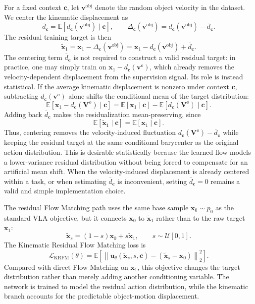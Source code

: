 \documentclass[10pt,twocolumn,letterpaper]{article}
\begin{document}
For a fixed context $\mathbf c$, let $\mathbf v^\text{obj}$ denote the random object
velocity in the dataset. We center the kinematic displacement as
\[
    \bar d_{\mathbf c}
    =
    \mathbb E[d_{\mathbf c}(\mathbf v^\text{obj})\mid\mathbf c],
    \qquad
    \Delta_{\mathbf c}(\mathbf v^\text{obj})
    =
    d_{\mathbf c}(\mathbf v^\text{obj})-\bar d_{\mathbf c}.
\]
The residual training target is then
\begin{equation}
    \widetilde{\mathbf x}_1
    =
    \mathbf x_1-\Delta_{\mathbf c}(\mathbf v^\text{obj})
    =
    \mathbf x_1-d_{\mathbf c}(\mathbf v^\text{obj})+\bar d_{\mathbf c}.
    \label{eq:residual_target}
\end{equation}
The centering term $\bar d_{\mathbf c}$ is not required to construct a valid
residual target: in practice, one may simply train on
$\mathbf x_1-d_{\mathbf c}(\mathbf v^o)$, which already removes the
velocity-dependent displacement from the supervision signal. Its role is instead
statistical. If the average kinematic displacement is nonzero under context
$\mathbf c$, subtracting $d_{\mathbf c}(\mathbf v^o)$ alone shifts the
conditional mean of the target distribution:
\[
    \mathbb E[\mathbf x_1-d_{\mathbf c}(\mathbf V^o)\mid \mathbf c]
    =
    \mathbb E[\mathbf x_1\mid \mathbf c]
    -
    \mathbb E[d_{\mathbf c}(\mathbf V^o)\mid \mathbf c].
\]
Adding back $\bar d_{\mathbf c}$ makes the residualization mean-preserving,
since
\[
    \mathbb E[\widetilde{\mathbf x}_1\mid \mathbf c]
    =
    \mathbb E[\mathbf x_1\mid \mathbf c].
\]
Thus, centering removes the velocity-induced fluctuation
$d_{\mathbf c}(\mathbf V^o)-\bar d_{\mathbf c}$ while keeping the residual
target at the same conditional barycenter as the original action distribution.
This is desirable statistically because the learned flow models a lower-variance
residual distribution without being forced to compensate for an artificial mean
shift. When the velocity-induced displacement is already centered within a task,
or when estimating $\bar d_{\mathbf c}$ is inconvenient, setting
$\bar d_{\mathbf c}=0$ remains a valid and simple implementation choice.

The residual Flow Matching path uses the same base sample $\mathbf x_0\sim p_0$
as the standard VLA objective, but it connects $\mathbf x_0$ to
$\widetilde{\mathbf x}_1$ rather than to the raw target $\mathbf x_1$:
\[
    \widetilde{\mathbf x}_s
    =
    (1-s)\mathbf x_0+s\widetilde{\mathbf x}_1,
    \qquad
    s\sim\mathcal U[0,1].
\]
The Kinematic Residual Flow Matching loss is
\begin{equation}
    \mathcal L_{\mathrm{KRFM}}(\theta)
    =
    \mathbb E
    \left[
        \left\|
            \mathbf u_\theta(\widetilde{\mathbf x}_s,s,\mathbf c)
            -
            (\widetilde{\mathbf x}_s-\mathbf x_0)
        \right\|_2^2
    \right].
    \label{eq:krfm_loss}
\end{equation}
Compared with direct Flow Matching on $\mathbf x_1$, this objective changes the
target distribution rather than merely adding another conditioning variable. The
network is trained to model the residual action distribution, while the
kinematic branch accounts for the predictable object-motion displacement.
\end{document}
